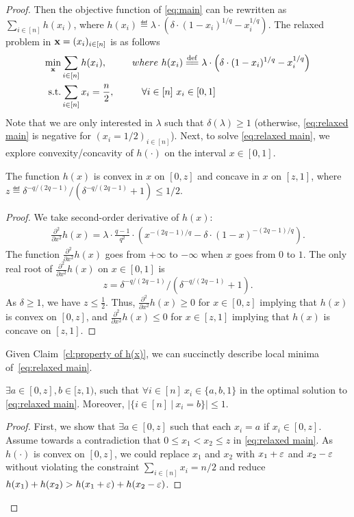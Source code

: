 \begin{proof}
Then the objective function of \eqref{eq:main} can be rewritten as $\sum_{i\in[n]}h(x_i)$, where $h(x_i)\eqdef \lambda\cdot\left(\delta\cdot(1-x_i)^{1/q}-x_i^{1/q}\right)$. The relaxed problem in $\mathbf{x}=(x_i)_{i\in[n]}$ is as follows
\begin{align}
 \label{eq:relaxed main}
 \min\limits_{\mathbf{x}}& \sum_{i\in[n]} h(x_i), &&\quad
 where~ h(x_i)\overset{\mathrm{def}}{=\mathrel{\mkern-3mu}=} \lambda\cdot\left(\delta\cdot(1-x_i)^{1/q}- x_i^{1/q}\right)\nonumber\\
 \text{s.t.}&  \sum_{i\in [n]}x_i = \frac{n}{2},
 &&\quad\quad \forall i\in[n]~x_i\in[0,1]
\end{align}
Note that we are only interested in $\lambda$ such that $\delta(\lambda)\ge 1$ (otherwise, \eqref{eq:relaxed main} is negative for $(x_i=1/2)_{i\in[n]}$). Next, to solve \eqref{eq:relaxed main}, we explore convexity/concavity of $h(\cdot)$ on the interval $x\in[0,1]$.
\begin{claim}
    \label{cl:property of h(x)}
    The function $h(x)$ is convex in $x$ on $[0,z]$ and concave in $x$ on $[z,1]$, where $z\eqdef\delta^{-q/(2q-1)}/\left(\delta^{-q/(2q-1)}+1\right)\le 1/2$.
\end{claim}
\begin{proof}
We take second-order derivative of $h(x)$:
\begin{align*}
    \frac{\partial^2}{\partial x^2}h(x)=\lambda\cdot\frac{q-1}{q^2}\cdot\left(x^{-(2q-1)/q}-\delta\cdot(1-x)^{-(2q-1)/q}\right).
\end{align*}
The function $\frac{\partial^2}{\partial x^2}h(x)$ goes from $+\infty$ to $-\infty$ when $x$ goes from $0$ to $1$. The only real root of $\frac{\partial^2}{\partial x^2}h(x)$ on $x\in[0,1]$ is 
\[
z=\delta^{-q/(2q-1)}/\left(\delta^{-q/(2q-1)}+1\right).
\] 
As $\delta\ge 1$, we have $z\le\frac{1}{2}$.
Thus, $\frac{\partial^2}{\partial x^2}h(x)\ge 0$
for $x\in[0,z]$ implying that $h(x)$ is convex on $[0,z]$, and $\frac{\partial^2}{\partial x^2}h(x)\le 0$
for $x\in[z,1]$ implying that $h(x)$ is concave on $[z,1]$.
\end{proof}
Given Claim~\ref{cl:property of h(x)}, we can succinctly describe local minima of~\eqref{eq:relaxed main}.
\begin{lemma}
    \label{optimal value of x_i}
    $\exists a\in[0,z],b\in[z,1)$, such that
    $\forall i\in[n]~x_i\in\{a, b, 1\}$ in the optimal solution to \eqref{eq:relaxed main}. Moreover, $\vert\{i\in[n]~\vert~ x_i=b\}\vert\le 1$. 
\end{lemma}
\begin{proof}
First, we show that $\exists a\in[0,z]$ such that each $x_i=a$ if $x_i\in[0,z]$. Assume towards a contradiction that $0\le x_1 < x_2\le z$ in \eqref{eq:relaxed main}. As $h(\cdot)$ is convex on $[0,z]$, we could replace $x_1$ and $x_2$ with $x_1+\varepsilon$ and $x_2-\varepsilon$ without violating the constraint $\sum_{i\in[n]}x_i=n/2$ and reduce $h(x_1)+h(x_2)>h(x_1+\varepsilon)+h(x_2-\varepsilon)$.


\end{proof}
\end{proof}
